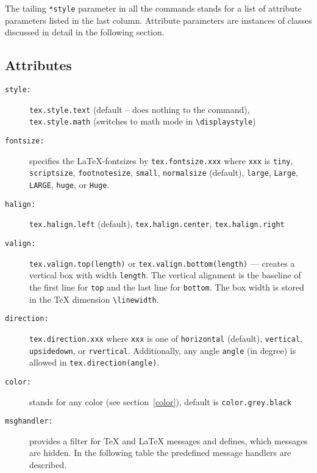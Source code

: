 The tailing \verb|*style| parameter in all the commands stands for a
list of attribute parameters listed in the last column. Attribute
parameters are instances of classes discussed in detail in the following
section.

\subsection{Attributes}
\begin{description}
\item[\texttt{style:}] \verb|tex.style.text| (default -- does nothing to
the command),\\\verb|tex.style.math| (switches to math mode in
\verb|\displaystyle|)
\item[\texttt{fontsize:}] specifies the \LaTeX-fontsizes by
\verb|tex.fontsize.xxx| where \verb|xxx| is
\verb|tiny|,
\verb|scriptsize|,
\verb|footnotesize|,
\verb|small|,
\verb|normalsize| (default),
\verb|large|,
\verb|Large|,
\verb|LARGE|,
\verb|huge|, or
\verb|Huge|.
\item[\texttt{halign:}] \verb|tex.halign.left| (default),
\verb|tex.halign.center|, \verb|tex.halign.right|
\item[\texttt{valign:}] \verb|tex.valign.top(length)| or
\verb|tex.valign.bottom(length)| --- creates a vertical box with width
\verb|length|. The vertical alignment is the baseline of the first line
for \verb|top| and the last line for \verb|bottom|. The box width is
stored in the \TeX{} dimension \verb|\linewidth|.
\item[\texttt{direction:}] \verb|tex.direction.xxx| where \verb|xxx| is
one of \verb|horizontal| (default), \verb|vertical|, \verb|upsidedown|,
or \verb|rvertical|. Additionally, any angle \verb|angle| (in degree) is
allowed in \verb|tex.direction(angle)|.
\item[\texttt{color:}] stands for any \PyX{} color (see
section~\ref{color}), default is \verb|color.grey.black|
\item[\texttt{msghandler:}] provides a filter for \TeX{} and \LaTeX{}
messages and defines, which messages are hidden. In the following table
the predefined message handlers are described.


\end{description}
